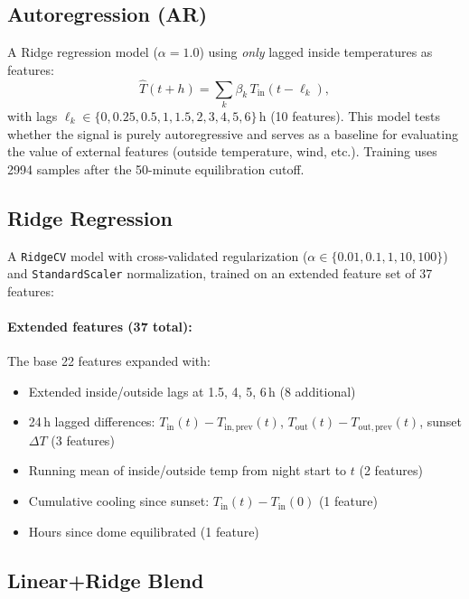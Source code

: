 \documentclass[11pt]{article}
\begin{document}
\subsection{Autoregression (AR)}

A Ridge regression model ($\alpha = 1.0$) using \emph{only} lagged inside
temperatures as features:
\begin{equation}
  \hat{T}(t+h) = \sum_{k} \beta_k \, T_\mathrm{in}(t - \ell_k),
\end{equation}
with lags $\ell_k \in \{0, 0.25, 0.5, 1, 1.5, 2, 3, 4, 5, 6\}$\,h
(10 features).  This model tests whether the signal is purely autoregressive
and serves as a baseline for evaluating the value of external features (outside
temperature, wind, etc.).  Training uses 2994 samples after the 50-minute
equilibration cutoff.

\subsection{Ridge Regression}

A \texttt{RidgeCV} model with cross-validated regularization
($\alpha \in \{0.01, 0.1, 1, 10, 100\}$) and \texttt{StandardScaler}
normalization, trained on an extended feature set of 37 features:

\paragraph{Extended features (37 total):}
The base 22 features expanded with:
\begin{itemize}
  \item Extended inside/outside lags at 1.5, 4, 5, 6\,h (8 additional)
  \item 24\,h lagged differences: $T_\mathrm{in}(t) - T_\mathrm{in,prev}(t)$,
        $T_\mathrm{out}(t) - T_\mathrm{out,prev}(t)$, sunset $\Delta T$ (3 features)
  \item Running mean of inside/outside temp from night start to $t$ (2 features)
  \item Cumulative cooling since sunset: $T_\mathrm{in}(t) - T_\mathrm{in}(0)$ (1 feature)
  \item Hours since dome equilibrated (1 feature)
\end{itemize}

\subsection{Linear+Ridge Blend}
\end{document}

